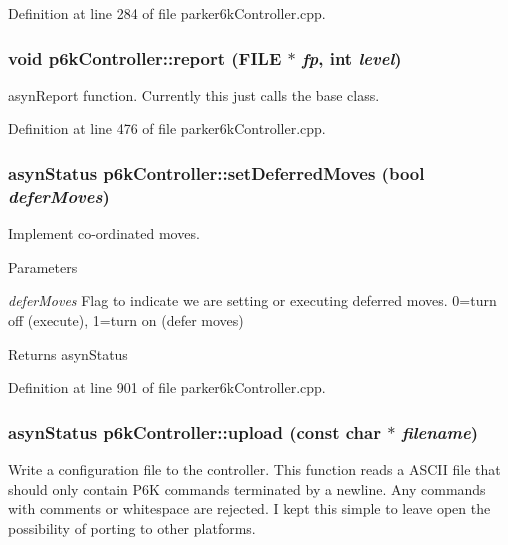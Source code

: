 Definition at line 284 of file parker6kController.cpp.\hypertarget{classp6kController_ae352b601eee75d91883b6955fafa25c8}{
\subsubsection[{report}]{\setlength{\rightskip}{0pt plus 5cm}void p6kController::report (FILE $\ast$ {\em fp}, \/  int {\em level})}}
\label{classp6kController_ae352b601eee75d91883b6955fafa25c8}
asynReport function. Currently this just calls the base class. 

Definition at line 476 of file parker6kController.cpp.\hypertarget{classp6kController_ad8b3998f6cfb1016e86aff07eb318aca}{
\subsubsection[{setDeferredMoves}]{\setlength{\rightskip}{0pt plus 5cm}asynStatus p6kController::setDeferredMoves (bool {\em deferMoves})}}
\label{classp6kController_ad8b3998f6cfb1016e86aff07eb318aca}
Implement co-\/ordinated moves. 
\begin{DoxyParams}{Parameters}
\item[{\em deferMoves}]Flag to indicate we are setting or executing deferred moves. 0=turn off (execute), 1=turn on (defer moves) \end{DoxyParams}
\begin{DoxyReturn}{Returns}
asynStatus 
\end{DoxyReturn}


Definition at line 901 of file parker6kController.cpp.\hypertarget{classp6kController_a01dd35adfa9e7382ce2314f301f15fda}{
\subsubsection[{upload}]{\setlength{\rightskip}{0pt plus 5cm}asynStatus p6kController::upload (const char $\ast$ {\em filename})}}
\label{classp6kController_a01dd35adfa9e7382ce2314f301f15fda}
Write a configuration file to the controller. This function reads a ASCII file that should only contain P6K commands terminated by a newline. Any commands with comments or whitespace are rejected. I kept this simple to leave open the possibility of porting to other platforms.

